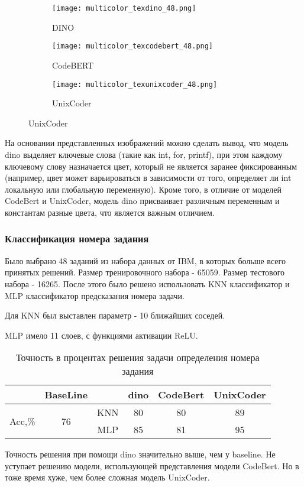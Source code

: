 \documentclass[../part_3.tex]{subfiles}
\begin{document}
\begin{figure}[H]
	\centering
	\begin{subfigure}{.32\textwidth}
		\centering
		\texttt{[image: multicolor\_texdino\_48.png]}
		\caption{DINO}
	\end{subfigure}
	\hfill
	\begin{subfigure}{.32\textwidth}
		\centering
		\texttt{[image: multicolor\_texcodebert\_48.png]}
		\caption{CodeBERT}
	\end{subfigure}
	\hfill
	\begin{subfigure}{.32\textwidth}
		\centering
		\texttt{[image: multicolor\_texunixcoder\_48.png]}
		\caption{UnixCoder}
	\end{subfigure}
	\vspace{1cm}
\end{figure}
\par На основании представленных изображений можно сделать вывод, что модель \acrshort{dino} выделяет ключевые слова (такие как int, for, printf), при этом каждому ключевому слову назначается цвет, который не является заранее фиксированным (например, цвет может варьироваться в зависимости от того, определяет ли int локальную или глобальную переменную). Кроме того, в отличие от моделей CodeBert и UnixCoder, модель \acrshort{dino} присваивает различным переменным и константам разные цвета, что является важным отличием.
\subsubsection{Классификация номера задания}
\par Было выбрано 48 заданий из набора данных от IBM, в которых больше всего принятых решений. Размер тренировочного набора - 65059. Размер тестового набора - 16265. После этого было решено использовать KNN классификатор и MLP классификатор предсказания номера задачи.
\par Для KNN был выставлен параметр - 10 ближайших соседей.
\par MLP имело 11 слоев, с функциями активации ReLU.
\begin{table}[H]
	\centering
	\begin{tabular}{|c|c||c|c|c|c|}\hline
		                        & BaseLine            &     & \acrshort{dino} & CodeBert & UnixCoder \\ \hline
		\multirow{2}{*}{Acc,\%} & \multirow{2}{*}{76} & KNN & 80      & 80       & 89        \\\cline{3-6}
		                        &                     & MLP & 85      & 81       & 95        \\\hline
	\end{tabular}
	\caption{Точность в процентах решения задачи определения номера задания}
\end{table}
\par Точность решения при помощи \acrshort{dino} значительно выше, чем у baseline. Не уступает решению модели, использующей представления модели CodeBert. Но в тоже время хуже, чем более сложная модель UnixCoder.
\end{document}
